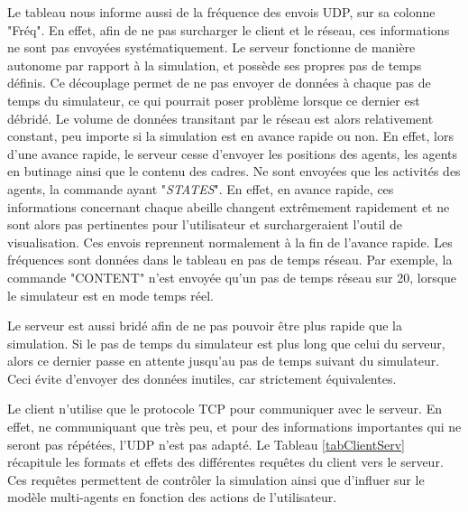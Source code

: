 	Le tableau nous informe aussi de la fréquence des envois UDP, sur sa colonne "Fréq". En effet, afin de ne pas surcharger le client et le réseau, ces informations ne sont pas envoyées systématiquement. Le serveur fonctionne de manière autonome par rapport à la simulation, et possède ses propres pas de temps définis. Ce découplage permet de ne pas envoyer de données à chaque pas de temps du simulateur, ce qui pourrait poser problème lorsque ce dernier est débridé. Le volume de données transitant par le réseau est alors relativement constant, peu importe si la simulation est en avance rapide ou non. En effet, lors d'une avance rapide, le serveur cesse d'envoyer les positions des agents, les agents en butinage ainsi que le contenu des cadres. Ne sont envoyées que les activités des agents, la commande ayant "\textit{STATES}". En effet, en avance rapide, ces informations concernant chaque abeille changent extrêmement rapidement et ne sont alors pas pertinentes pour l'utilisateur et surchargeraient l'outil de visualisation. Ces envois reprennent normalement à la fin de l'avance rapide.
	Les fréquences sont données dans le tableau en pas de temps réseau. Par exemple, la commande "CONTENT" n'est envoyée qu'un pas de temps réseau sur 20, lorsque le simulateur est en mode temps réel. 
	
 	Le serveur est aussi bridé afin de ne pas pouvoir être plus rapide que la simulation. Si le pas de temps du simulateur est plus long que celui du serveur, alors ce dernier passe en attente jusqu'au pas de temps suivant du simulateur. Ceci évite d'envoyer des données inutiles, car strictement équivalentes.
	
	Le client n'utilise que le protocole TCP pour communiquer avec le serveur. En effet, ne communiquant que très peu, et pour des informations importantes qui ne seront pas répétées, l'UDP n'est pas adapté. Le Tableau \ref{tabClientServ} récapitule les formats et effets des différentes requêtes du client vers le serveur. Ces requêtes permettent de contrôler la simulation ainsi que d'influer sur le modèle multi-agents en fonction des actions de l'utilisateur.
	
